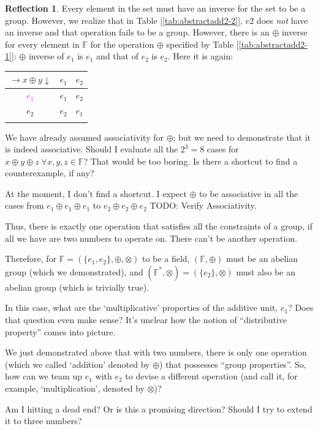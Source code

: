 \documentclass[english,notitlepage,smartquotes]{hgbreport}
\theoremstyle{definition}
\theoremstyle{definition}
\theoremstyle{remark}
\theoremstyle{definition}
\theoremstyle{plain}
\theoremstyle{definition}
\newtheorem{reflection}{Reflection}
\begin{document}
\begin{reflection}
Every element in the set must have an inverse for the set to be a group. However, we realize that in Table [\ref{tab:abstractadd2-2}], $e2$ does \emph{not} have an inverse and that operation fails to be a group. However, there is an $\oplus$ inverse for every element in $\mathbb{F}$ for the operation $\oplus$ specified by Table [\ref{tab:abstractadd2-1}]: $\oplus$ inverse of $e_1$ is $e_1$ and that of $e_2$ is $e_2$. Here it is again:

\begin{tabular}{c|cc}
\centering
$\rightarrow x\oplus y\downarrow$ & $e_1$ & $e_2$\\
\hline
\textcolor{magenta}{$e_1$} & $e_1$ & $e_2$\\
$e_2$ & $e_2$ & $e_1$\\
\label{tab:almostfinaladdop}
\end{tabular}

We have already assumed associativity for $\oplus$; but we need to demonstrate that it is indeed associative. Should I evaluate all the $2^3=8$ cases for $x\oplus y\oplus z\;\forall x,y,z\in\mathbb{F}$?  That would be too boring. Is there a shortcut to find a counterexample, if any? 

At the moment, I don't find a shortcut. I expect $\oplus$ to be associative in all the cases from $e_1\oplus e_1\oplus e_1$ to $e_2\oplus e_2\oplus e_2$ {TODO: Verify Associativity}.


Thus, there is exactly one operation that satisfies all the constraints of a group, if all we have are two numbers to operate on. There can't be another operation. 

Therefore, for $\mathbb{F}=(\{e_1,e_2\},\oplus,\otimes)$ to be a field, $(\mathbb{F},\oplus)$ must be an abelian group (which we demonstrated), and $(\mathbb{F}^*,\otimes)=(\{e_2\},\otimes)$ must also be an abelian group (which is trivially true).

In this case, what are the `multiplicative' properties of the additive unit, $e_1$? Does that question even make sense? It's unclear how the notion of ``distributive property'' comes into picture.

We just demonstrated above that with two numbers, there is only one operation (which we called `addition' denoted by $\oplus$) that possesses ``group properties''. So, how can we team up $e_1$ with $e_2$ to devise a different operation (and call it, for example, `multiplication', denoted by $\otimes$)?

Am I hitting a dead end? Or is this a promising direction? Should I try to extend it to three numbers?


\end{reflection}
\end{document}
